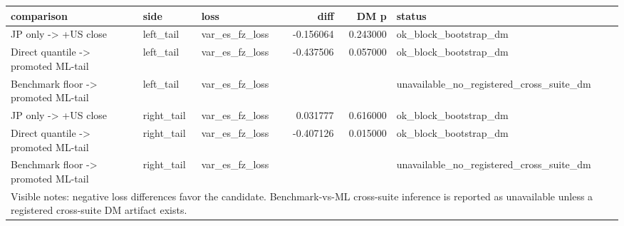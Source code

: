 \begin{tabular}{lllrrl}
\toprule
comparison & side & loss & diff & DM p & status \\
\midrule
JP only -> +US close & left\_tail & var\_es\_fz\_loss & -0.156064 & 0.243000 & ok\_block\_bootstrap\_dm \\
Direct quantile -> promoted ML-tail & left\_tail & var\_es\_fz\_loss & -0.437506 & 0.057000 & ok\_block\_bootstrap\_dm \\
Benchmark floor -> promoted ML-tail & left\_tail & var\_es\_fz\_loss &  &  & unavailable\_no\_registered\_cross\_suite\_dm \\
JP only -> +US close & right\_tail & var\_es\_fz\_loss & 0.031777 & 0.616000 & ok\_block\_bootstrap\_dm \\
Direct quantile -> promoted ML-tail & right\_tail & var\_es\_fz\_loss & -0.407126 & 0.015000 & ok\_block\_bootstrap\_dm \\
Benchmark floor -> promoted ML-tail & right\_tail & var\_es\_fz\_loss &  &  & unavailable\_no\_registered\_cross\_suite\_dm \\
\midrule
\multicolumn{6}{l}{\footnotesize Visible notes: negative loss differences favor the candidate. Benchmark-vs-ML cross-suite inference is reported as unavailable unless a registered cross-suite DM artifact exists.} \\
\bottomrule
\end{tabular}
